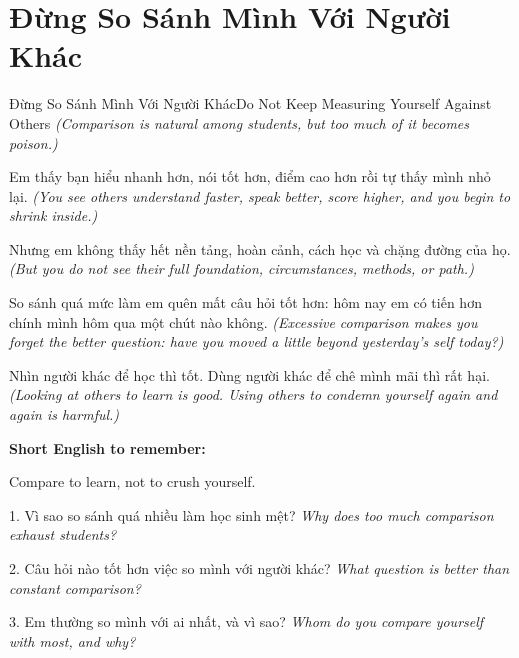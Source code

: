 \section{Đừng So Sánh Mình Với Người Khác}
\begin{truyen}{Đừng So Sánh Mình Với Người Khác}{Do Not Keep Measuring Yourself Against Others}
\textit{(Comparison is natural among students, but too much of it becomes poison.)}

Em thấy bạn hiểu nhanh hơn, nói tốt hơn, điểm cao hơn rồi tự thấy mình nhỏ lại.
\textit{(You see others understand faster, speak better, score higher, and you begin to shrink inside.)}

Nhưng em không thấy hết nền tảng, hoàn cảnh, cách học và chặng đường của họ.
\textit{(But you do not see their full foundation, circumstances, methods, or path.)}

So sánh quá mức làm em quên mất câu hỏi tốt hơn: hôm nay em có tiến hơn chính mình hôm qua một chút nào không.
\textit{(Excessive comparison makes you forget the better question: have you moved a little beyond yesterday's self today?)}
\end{truyen}

\begin{baihoc}
Nhìn người khác để học thì tốt. Dùng người khác để chê mình mãi thì rất hại.
\textit{(Looking at others to learn is good. Using others to condemn yourself again and again is harmful.)}
\end{baihoc}

\begin{ghinhoanh}
\textbf{Short English to remember:}

Compare to learn, not to crush yourself.

\end{ghinhoanh}

\begin{tuhocnhanh}
1. Vì sao so sánh quá nhiều làm học sinh mệt? \textit{Why does too much comparison exhaust students?}

2. Câu hỏi nào tốt hơn việc so mình với người khác? \textit{What question is better than constant comparison?}

3. Em thường so mình với ai nhất, và vì sao? \textit{Whom do you compare yourself with most, and why?}
\end{tuhocnhanh}
\ngancach

